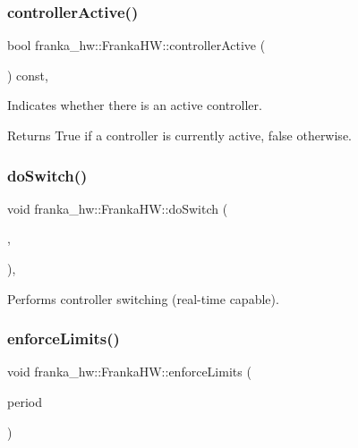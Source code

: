 \subsubsection{\texorpdfstring{controller\+Active()}{controllerActive()}}
{\footnotesize\ttfamily bool franka\+\_\+hw\+::\+Franka\+H\+W\+::controller\+Active (\begin{DoxyParamCaption}{ }\end{DoxyParamCaption}) const\hspace{0.3cm}{\ttfamily [virtual]}, {\ttfamily [noexcept]}}

Indicates whether there is an active controller.

\begin{DoxyReturn}{Returns}
True if a controller is currently active, false otherwise. 
\end{DoxyReturn}
\mbox{\label{classfranka__hw_1_1_franka_h_w_ab29812769471d212a30dac6c19c12884}} 
\subsubsection{\texorpdfstring{do\+Switch()}{doSwitch()}}
{\footnotesize\ttfamily void franka\+\_\+hw\+::\+Franka\+H\+W\+::do\+Switch (\begin{DoxyParamCaption}\item[{const std\+::list$<$ hardware\+\_\+interface\+::\+Controller\+Info $>$ \&}]{,  }\item[{const std\+::list$<$ hardware\+\_\+interface\+::\+Controller\+Info $>$ \&}]{ }\end{DoxyParamCaption})\hspace{0.3cm}{\ttfamily [override]}, {\ttfamily [virtual]}}

Performs controller switching (real-\/time capable). \mbox{\label{classfranka__hw_1_1_franka_h_w_afb0f49fec764be80e4c89e29706a4936}} 
\subsubsection{\texorpdfstring{enforce\+Limits()}{enforceLimits()}}
{\footnotesize\ttfamily void franka\+\_\+hw\+::\+Franka\+H\+W\+::enforce\+Limits (\begin{DoxyParamCaption}\item[{const ros\+::\+Duration \&}]{period }\end{DoxyParamCaption})\hspace{0.3cm}{\ttfamily [virtual]}}

